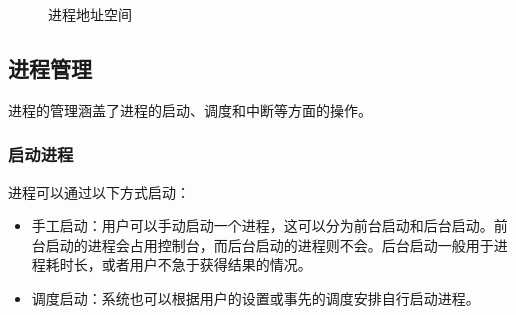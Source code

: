 \documentclass[12pt, a4paper, oneside]{ctexbook}
\numberwithin{figure}{section}
\begin{document}
\begin{figure}[H]
\centering
 \caption{进程地址空间}
 \label{}
\end{figure}

\subsection{进程管理}
进程的管理涵盖了进程的启动、调度和中断等方面的操作。

\subsubsection{启动进程}
进程可以通过以下方式启动：
\begin{itemize}
    \item 手工启动：用户可以手动启动一个进程，这可以分为前台启动和后台启动。前台启动的进程会占用控制台，而后台启动的进程则不会。后台启动一般用于进程耗时长，或者用户不急于获得结果的情况。
    \item 调度启动：系统也可以根据用户的设置或事先的调度安排自行启动进程。
\end{itemize}
\end{document}
